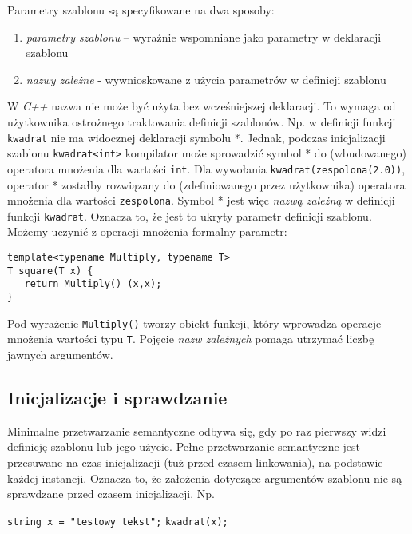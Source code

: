 \documentclass[11pt, a4paper]{article}
\begin{document}
Parametry szablonu są specyfikowane na dwa sposoby:

\begin{enumerate}

\item \emph{parametry szablonu} – wyraźnie wspomniane jako parametry w deklaracji szablonu

\item \emph{nazwy zależne} - wywnioskowane z użycia parametrów w definicji szablonu

\end{enumerate}

W \emph{C++} nazwa nie może być użyta bez wcześniejszej deklaracji. To wymaga od użytkownika ostrożnego traktowania definicji szablonów. Np. w definicji funkcji \verb#kwadrat# nie ma widocznej deklaracji symbolu *. Jednak, podczas inicjalizacji szablonu \verb#kwadrat<int># kompilator może sprowadzić symbol * do (wbudowanego) operatora mnożenia dla wartości \verb#int#. Dla wywołania \verb#kwadrat(zespolona(2.0))#, operator * zostałby rozwiązany do (zdefiniowanego przez użytkownika) operatora mnożenia dla wartości \verb#zespolona#. Symbol * jest więc \emph{nazwą zależną} w definicji funkcji \verb#kwadrat#. Oznacza to, że jest to ukryty parametr definicji szablonu. Możemy uczynić z operacji mnożenia formalny parametr:

\begin{lstlisting}[frame=single]
template<typename Multiply, typename T>
T square(T x) {
   return Multiply() (x,x);
}
\end{lstlisting}

Pod-wyrażenie \verb#Multiply()# tworzy obiekt funkcji, który wprowadza operacje mnożenia wartości typu \verb#T#. Pojęcie \emph{nazw zależnych} pomaga utrzymać liczbę jawnych argumentów.

\subsection{Inicjalizacje i sprawdzanie}

Minimalne przetwarzanie semantyczne odbywa się, gdy po raz pierwszy widzi definicję szablonu lub jego użycie. Pełne przetwarzanie semantyczne jest przesuwane na czas inicjalizacji (tuż przed czasem linkowania), na podstawie każdej instancji. Oznacza to, że założenia dotyczące argumentów szablonu nie są sprawdzane przed czasem inicjalizacji. Np.\newline

\noindent \verb#string x = "testowy tekst";# \newline
\verb#kwadrat(x);# \newline
\end{document}
